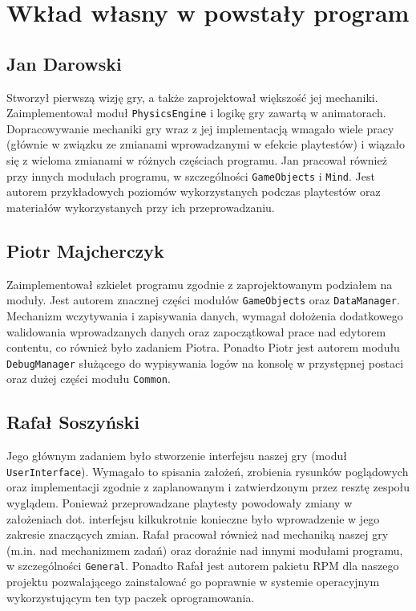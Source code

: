 \documentclass[licencjacka]{pracamgr}
\begin{document}
\chapter{Wkład własny w powstały program}

  \section{Jan Darowski}
    Stworzył pierwszą wizję gry, a także zaprojektował większość jej mechaniki. Zaimplementował moduł \texttt{PhysicsEngine} i
    logikę gry zawartą w animatorach. Dopracowywanie mechaniki gry wraz z jej implementacją wmagało wiele pracy (głównie w związku
    ze zmianami wprowadzanymi w efekcie playtestów) i wiązało się z wieloma zmianami w różnych częściach programu. 
    Jan pracował również przy innych modułach programu, w szczególności \texttt{GameObjects} i \texttt{Mind}. 
    Jest autorem przykładowych poziomów wykorzystanych podczas playtestów oraz materiałów wykorzystanych przy ich przeprowadzaniu.

  \section{Piotr Majcherczyk}
    Zaimplementował szkielet programu zgodnie z zaprojektowanym podziałem na moduły. Jest autorem znacznej części modułów \texttt{GameObjects}
    oraz \texttt{DataManager}. Mechanizm wczytywania i zapisywania danych, wymagał dołożenia dodatkowego walidowania wprowadzanych danych oraz
    zapoczątkował prace nad edytorem contentu, co również było zadaniem Piotra. Ponadto Piotr jest autorem modułu \texttt{DebugManager} służącego
    do wypisywania logów na konsolę w przystępnej postaci oraz dużej części modułu \texttt{Common}.

  \section{Rafał Soszyński}
    Jego głównym zadaniem było stworzenie interfejsu naszej gry (moduł \texttt{UserInterface}). Wymagało to spisania założeń, zrobienia 
    rysunków poglądowych oraz implementacji zgodnie z zaplanowanym i zatwierdzonym przez resztę zespołu wyglądem. Ponieważ przeprowadzane
    playtesty powodowały zmiany w założeniach dot. interfejsu kilkukrotnie konieczne było wprowadzenie w jego zakresie znaczących zmian.
    Rafał pracował również nad mechaniką naszej gry (m.in. nad mechanizmem zadań) oraz doraźnie nad innymi modułami programu, w szczególności
    \texttt{General}. Ponadto Rafał jest autorem pakietu RPM dla naszego projektu pozwalającego zainstalować go poprawnie w systemie operacyjnym
    wykorzystującym ten typ paczek oprogramowania.
\end{document}
